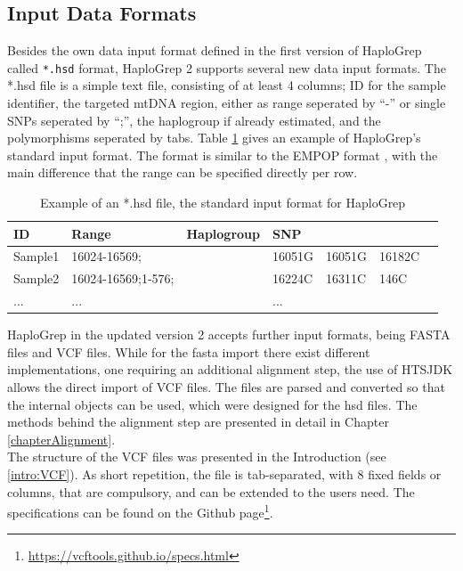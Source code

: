 \subsection{Input Data Formats}\label{hg:input}
Besides the own data input format defined in the first version of HaploGrep called \verb|*.hsd| format, HaploGrep 2 supports several new data input formats. 
The *.hsd file is a simple text file, consisting of at least 4 columns; ID for the sample identifier, the targeted mtDNA region, either as range seperated by "`-"' or single SNPs seperated by "`;"', the haplogroup if already estimated, and the polymorphisms seperated by tabs. Table \ref{table:hsd} gives an example of HaploGrep's standard input format.
The format is similar to the EMPOP format \cite{Parson2007}, with the main difference that the range can be specified directly per row.
\begin{table}[H]
  \begin{tabular}{lllllll}
    \toprule
    ID & Range & Haplogroup & SNP &  &  \\
		\midrule
	Sample1 & 16024-16569; &  & 16051G & 16051G & 16182C\\
	Sample2 & 16024-16569;1-576; &  & 16224C & 16311C & 146C\\
	... & ... & & ... & & & \\
		\bottomrule
\end{tabular}
\caption{Example of an *.hsd file, the standard input format for HaploGrep}
\label{table:hsd}
\end{table}

HaploGrep in the updated version 2 accepts further input formats, being FASTA files and VCF files. While for the fasta import there exist different implementations, one requiring an additional alignment step, the use of HTSJDK allows the direct import of VCF files. The files are parsed and converted so that the internal objects can be used, which were designed for the hsd files. The methods behind the alignment step are presented in detail in Chapter \ref{chapterAlignment}. 
\\
The structure of the VCF files was presented in the Introduction (see \ref{intro:VCF}). As short repetition, the file is tab-separated, with 8 fixed fields or columns, that are compulsory, and can be extended to the users need. The specifications can be found on the Github page\footnote{\url{https://vcftools.github.io/specs.html}}.


